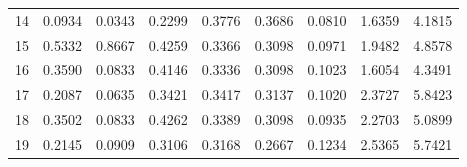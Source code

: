 \begin{anexosenv}
\begin{table}[htbp!]
\begin{tabular}{|l|l|l|l|l|l|l|l|l|}
14   & 0.0934   & 0.0343   & 0.2299               & 0.3776  & 0.3686   & 0.0810               & 1.6359  & 4.1815               \\
15   & 0.5332   & 0.8667   & 0.4259               & 0.3366  & 0.3098   & 0.0971               & 1.9482  & 4.8578               \\
16   & 0.3590   & 0.0833   & 0.4146               & 0.3336  & 0.3098   & 0.1023               & 1.6054  & 4.3491               \\
17   & 0.2087   & 0.0635   & 0.3421               & 0.3417  & 0.3137   & 0.1020               & 2.3727  & 5.8423               \\
18   & 0.3502   & 0.0833   & 0.4262               & 0.3389  & 0.3098   & 0.0935               & 2.2703  & 5.0899               \\
19   & 0.2145   & 0.0909   & 0.3106               & 0.3168  & 0.2667   & 0.1234               & 2.5365  & 5.7421              \\\hline
\end{tabular}
\end{table}

\end{anexosenv}